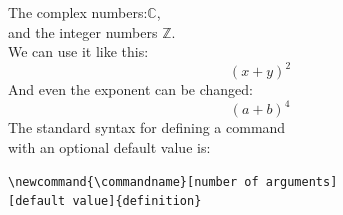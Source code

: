 \documentclass{article}
\begin{document}
\newcommand{\bb}[1]{\mathbb{#1}}
The complex numbers:\( \bb{C} \),\\ 
and the integer numbers \( \bb{Z} \).\\
\newcommand{\plusbin}[4][2]{(#2 + #3)^{#1}}
We can use it like this: 
\[ \plusbin{x}{y}{5} \]
And even the exponent can be changed:
\[ \plusbin[4]{a}{b}{g} \]
The standard syntax for defining a command
\\ with an optional default value is:
\begin{lstlisting}
\newcommand{\commandname}[number of arguments]
[default value]{definition}
\end{lstlisting}
\end{document}
